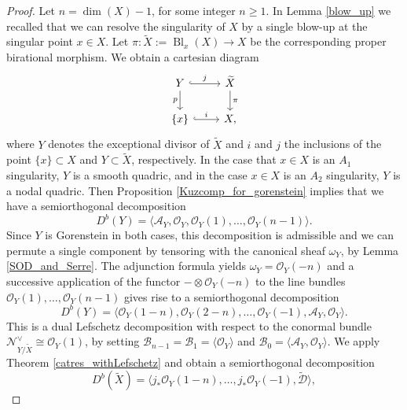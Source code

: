 \documentclass[a4paper, twoside, 11pt]{amsart}
\theoremstyle{definition}
\theoremstyle{remark}
\numberwithin{equation}{theorem}
\DeclareMathOperator{\bl}{Bl}
\begin{document}
\begin{proof}
	Let $n=\dim(X)-1$, for some integer $n \geq 1$. In Lemma \ref{blow_up} we recalled that we can resolve the singularity of $X$ by a single blow-up at the singular point $x \in X$. Let $\pi\colon\widetilde{X}:=\bl_x(X) \to X$ be the corresponding proper birational morphism. We obtain a cartesian diagram
	\begin{equation*}
		\begin{tikzcd}
			Y \arrow[d, "p"'] \arrow[r, hook, "j"] & \widetilde{X}  \arrow[d, "\pi"] \\
			\{x\} \arrow[r, hook, "i"]                     & X,                             
		\end{tikzcd}
	\end{equation*}
	where $Y$ denotes the exceptional divisor of $\widetilde{X}$ and $i$ and $j$ the inclusions of the point $\{x\} \subset X$ and $Y \subset \widetilde{X}$, respectively. In the case that $x\in X$ is an $A_1$ singularity, $Y$ is a smooth quadric, and in the case $x \in X$ is an $A_2$ singularity, $Y$ is a nodal quadric.  Then Proposition \ref{Kuzcomp_for_gorenstein} implies that we have a semiorthogonal decomposition
	\begin{equation}\label{decomp_exceptional}
		D^b(Y) = \langle \mathcal{A}_Y, \mathcal{O}_Y, \mathcal{O}_Y(1), \dots, \mathcal{O}_Y(n-1) \rangle. 
	\end{equation}
	Since $Y$ is Gorenstein in both cases, this decomposition is admissible and we can permute a single component by tensoring with the canonical sheaf $\omega_Y$, by Lemma \ref{SOD_and_Serre}. The adjunction formula yields $\omega_Y = \mathcal{O}_Y(-n)$ and a successive application of the functor $- \otimes \mathcal{O}_Y(-n)$ to the line bundles $\mathcal{O}_Y(1), \dots, \mathcal{O}_Y(n-1)$ gives rise to a semiorthogonal decomposition
	\begin{equation}\label{dual_lef}
		D^b(Y) = \langle \mathcal{O}_Y(1-n), \mathcal{O}_Y(2-n), \dots, \mathcal{O}_Y(-1), \mathcal{A}_Y, \mathcal{O}_Y \rangle.
	\end{equation}
	This is a dual Lefschetz decomposition with respect to the  conormal bundle $\mathcal{N}_{Y/\widetilde{X}}^{\vee} \cong \mathcal{O}_Y(1)$, by setting $\mathcal{B}_{n-1} = \mathcal{B}_{1} = \langle \mathcal{O}_Y\rangle$ and $\mathcal{B}_0 = \langle \mathcal{A}_Y, \mathcal{O}_Y \rangle$. We apply Theorem \ref{catres_withLefschetz} and obtain a semiorthogonal decomposition 
	\begin{equation}\label{SODLefschetz}
		D^b(\widetilde{X})= \langle j_*\mathcal{O}_Y(1-n),\dots, j_*\mathcal{O}_Y(-1),\widetilde{\mathcal{D}}\rangle,

\end{equation}
\end{proof}
\end{document}
